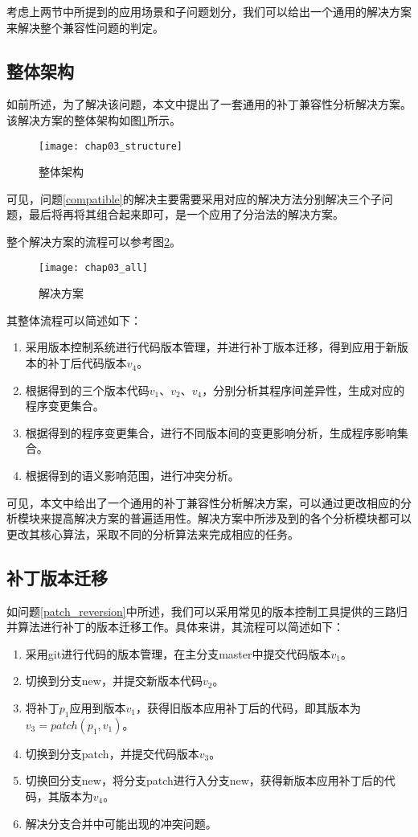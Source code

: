 考虑上两节中所提到的应用场景和子问题划分，我们可以给出一个通用的解决方案来解决整个兼容性问题的判定。

\subsection{整体架构}

如前所述，为了解决该问题，本文中提出了一套通用的补丁兼容性分析解决方案。该解决方案的整体架构如图\ref {structure}所示。

\begin{figure}[H]
	\centering
	\texttt{[image: chap03\_structure]}
	\caption {整体架构}	
	\label {structure}
\end{figure}

可见，问题\ref{compatible}的解决主要需要采用对应的解决方法分别解决三个子问题，最后将再将其组合起来即可，是一个应用了分治法的解决方案。


整个解决方案的流程可以参考图\ref {solution_all}。

\begin{figure}[H]
	\centering
	\texttt{[image: chap03\_all]}
	\caption {解决方案}
	\label {solution_all}	
\end{figure}

其整体流程可以简述如下：

\begin{enumerate}
	\item 采用版本控制系统进行代码版本管理，并进行补丁版本迁移，得到应用于新版本的补丁后代码版本$v_4$。
	\item 根据得到的三个版本代码$v_1$、$v_2$、$v_4$，分别分析其程序间差异性，生成对应的程序变更集合。
	\item 根据得到的程序变更集合，进行不同版本间的变更影响分析，生成程序影响集合。
	\item 根据得到的语义影响范围，进行冲突分析。
\end{enumerate}

可见，本文中给出了一个通用的补丁兼容性分析解决方案，可以通过更改相应的分析模块来提高解决方案的普遍适用性。解决方案中所涉及到的各个分析模块都可以更改其核心算法，采取不同的分析算法来完成相应的任务。

\subsection{补丁版本迁移}

如问题\ref {patch_reversion}中所述，我们可以采用常见的版本控制工具提供的三路归并算法进行补丁的版本迁移工作。具体来讲，其流程可以简述如下：
\begin{enumerate}
	\item 采用git进行代码的版本管理，在主分支master中提交代码版本$v_1$。
	\item 切换到分支new，并提交新版本代码$v_2$。
	\item 将补丁$p_1$应用到版本$v_1$，获得旧版本应用补丁后的代码，即其版本为$v_3 = patch(p_1,v_1)$。
	\item 切换到分支patch，并提交代码版本$v_3$。
	\item 切换回分支new，将分支patch进行入分支new，获得新版本应用补丁后的代码，其版本为$v_4$。
	\item 解决分支合并中可能出现的冲突问题。
\end{enumerate}

